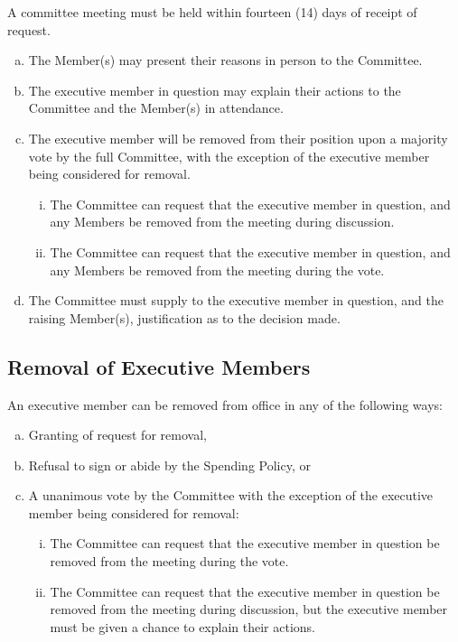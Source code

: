 \documentclass[a4paper,12pt]{article}
\begin{document}
A committee meeting must be held within fourteen (14) days of receipt of request.

\begin{enumerate}[a)]
	\item The Member(s) may present their reasons in person to the Committee.
	\item The executive member in question may explain their actions to the Committee and the Member(s) in attendance.
	\item The executive member will be removed from their position upon a majority vote by the full Committee, with the exception of the executive member being considered for removal.
	\begin{enumerate}[i)]
		\item The Committee can request that the executive member in question, and any Members be removed from the meeting during discussion.
		\item The Committee can request that the executive member in question, and any Members be removed from the meeting during the vote.
	\end{enumerate}
	\item The Committee must supply to the executive member in question, and the raising Member(s), justification as to the decision made.
\end{enumerate}

\subsection{Removal of Executive Members}

An executive member can be removed from office in any of the following ways:

\begin{enumerate}[a)]
	\item Granting of request for removal,
	\item Refusal to sign or abide by the Spending Policy, or
	\item A unanimous vote by the Committee with the exception of the executive member being considered for removal:
	\begin{enumerate}[i)]
		\item The Committee can request that the executive member in question be removed from the meeting during the vote.
		\item The Committee can request that the executive member in question be removed from the meeting during discussion, but the executive member must be given a chance to explain their actions.
	\end{enumerate}
\end{enumerate}
\end{document}
